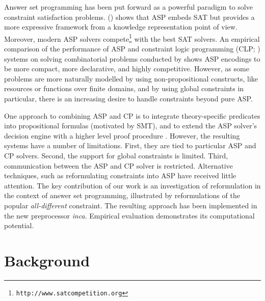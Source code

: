 \documentclass[letterpaper]{article}
\newcommand{\systemname}[1]{\textit{#1}}
\newcommand{\citeay}[1]{\citeauthor{#1} \citeyear{#1}}
\newcommand{\citeap}[1]{\citeauthor{#1} (\citeyear{#1})}
\begin{document}
Answer set programming has been put forward as a powerful paradigm to solve constraint  satisfaction problems. \citeap{niemela99a} shows that ASP embeds SAT but provides a more expressive framework from a knowledge representation point of view. Moreover, modern ASP solvers compete\footnote{\texttt{http://www.satcompetition.org}} with the best SAT solvers.
An empirical comparison of the performance of ASP and constraint logic programming (CLP; \citeay{jama94a}) systems on solving combinatorial problems conducted by \citeauthor{dofopo05a} shows ASP encodings to be more compact, more declarative, and highly competitive.
However, as some problems are more naturally modelled by using non-pro\-po\-si\-tional constructs, like resources or functions over finite domains, and by using global
constraints in particular, there is an increasing desire to handle constraints beyond pure ASP.

One approach to combining ASP and CP is to integrate theory-specific predicates into propositional formulas (motivated by SMT), and to extend the ASP solver's decision engine with a higher level proof procedure \cite{baboge05a,melgel08a,geossc09a}. However, the resulting systems have a number of limitations. First, they are tied to particular ASP and CP solvers. Second, the support for global constraints is limited. Third, communication between the ASP and CP solver is restricted.
Alternative techniques, such as reformulating constraints into ASP have received little attention.
The key contribution of our work is an investigation of reformulation in the context of answer set programming, illustrated by reformulations of the popular \emph{all-different} constraint. The resulting approach has been implemented in the new preprocessor \systemname{inca}. Empirical evaluation demonstrates its computational potential.



\section{Background}
\end{document}
